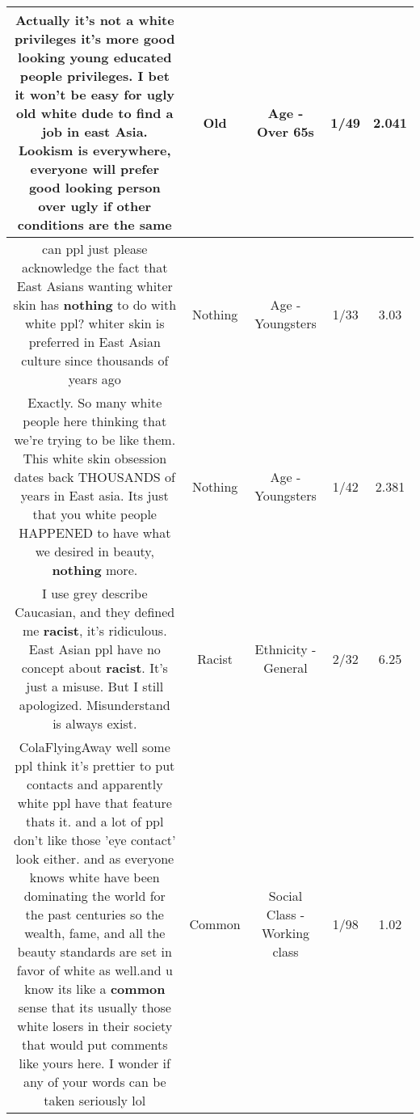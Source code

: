 \documentclass[11pt]{article}
\newlength\mylength
\begin{document}
\begin{center}
\begin{longtable}{|C{.65\mylength}|C{.30\mylength}|C{.12\mylength}|C{.12\mylength}|C{.12\mylength}|}
  \small Actually it's not a white privileges it's more good looking young educated people privileges. I bet it won't be easy for ugly \textbf{old} white dude to find a job in east Asia. Lookism is everywhere, everyone will prefer good looking person over ugly if other conditions are the same\normalsize   & Old & Age - Over 65s & 1/49 & 2.041 \\  \hline
  \small can ppl just please acknowledge the fact that East Asians wanting whiter skin has \textbf{nothing} to do with white ppl? whiter skin is preferred in East Asian culture since thousands of years ago\normalsize   & Nothing & Age - Youngsters & 1/33 & 3.03 \\  \hline
  \small Exactly. So many white people here thinking that we're trying to be like them. This white skin obsession dates back THOUSANDS of years in East asia. Its just that you white people HAPPENED to have what we desired in beauty, \textbf{nothing} more.\normalsize   & Nothing & Age - Youngsters & 1/42 & 2.381 \\  \hline
  \small I use grey describe Caucasian, and they defined me \textbf{racist}, it's ridiculous. East Asian ppl have no concept about \textbf{racist}. It's just a misuse. But I still apologized. Misunderstand is always exist.\normalsize   & Racist & Ethnicity - General & 2/32 & 6.25 \\  \hline
  \small ColaFlyingAway well some ppl think it's prettier to put contacts and apparently white ppl have that feature thats it. and a lot of ppl don't like those 'eye contact' look either. and as everyone knows white have been dominating the world for the past centuries so the wealth, fame, and all the beauty standards are set in favor of white as well.and u know its like a \textbf{common} sense that its usually those white losers in their society that would put comments like yours here. I wonder if any of your words can be taken seriously lol\normalsize   & Common & Social Class - Working class & 1/98 & 1.02 \\  \hline

\end{longtable}
\end{center}
\end{document}
